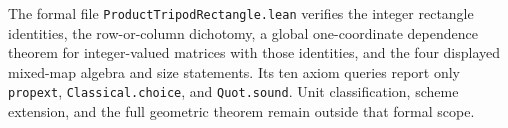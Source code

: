 The formal file \texttt{ProductTripodRectangle.lean} verifies the integer
rectangle identities, the row-or-column dichotomy, a global one-coordinate
dependence theorem for integer-valued matrices with those identities, and
the four displayed mixed-map algebra and size statements. Its ten axiom
queries report only \texttt{propext}, \texttt{Classical.choice}, and
\texttt{Quot.sound}. Unit classification, scheme extension, and the full
geometric theorem remain outside that formal scope.

